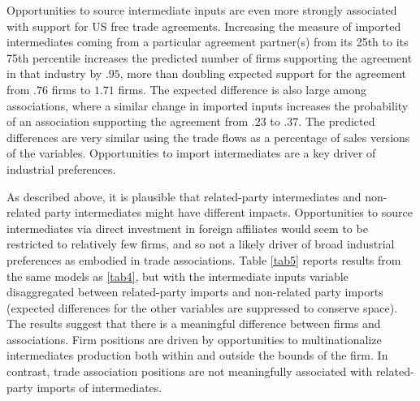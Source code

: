 \documentclass[hidelinks,12pt,letter]{article}
\begin{document}
Opportunities to source intermediate inputs are even more strongly associated with support for US free trade agreements. Increasing the measure of imported intermediates coming from a particular agreement partner(s) from its 25th to its 75th percentile increases the predicted number of firms supporting the agreement in that industry by $.95$, more than doubling expected support for the agreement from $.76$ firms to $1.71$ firms. The expected difference is also large among associations, where a similar change in imported inputs increases the probability of an association supporting the agreement from $.23$ to $.37$. The predicted differences are very similar using the trade flows as a percentage of sales versions of the variables. Opportunities to import intermediates are a key driver of industrial preferences.

As described above, it is plausible that related-party intermediates and non-related party intermediates might have different impacts. Opportunities to source intermediates via direct investment in foreign affiliates would seem to be restricted to relatively few firms, and so not a likely driver of broad industrial preferences as embodied in trade associations. Table \ref{tab5} reports results from the same models as \ref{tab4}, but with the intermediate inputs variable disaggregated between related-party imports and non-related party imports (expected differences for the other variables are suppressed to conserve space). The results suggest that there is a meaningful difference between firms and associations. Firm positions are driven by opportunities to multinationalize intermediates production both within and outside the bounds of the firm. In contrast, trade association positions are not meaningfully associated with related-party imports of intermediates. %

\end{document}
